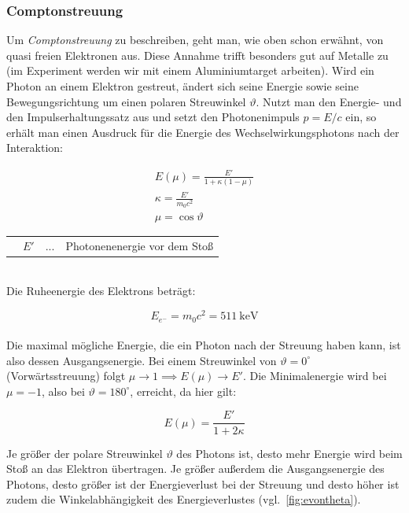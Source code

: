 \documentclass[slug=CS, room=Andreas-Schubert-Bau\,\ Labor\ 406,
supervisor=Juliane\ Volkmer, coursedate=29.\ 11.\ 2019]{../../Lab_Report_LaTeX/lab_report}
\newcommand{\cs}{\emph{Comptonstreuung }}
\begin{document}
\subsubsection{Comptonstreuung}
\label{sec:cs}

Um \cs zu beschreiben, geht man, wie oben schon erwähnt, von quasi freien Elektronen aus.
Diese Annahme trifft besonders gut auf Metalle zu (im Experiment werden wir mit einem Aluminiumtarget arbeiten).
Wird ein Photon an einem Elektron gestreut, ändert sich seine Energie sowie seine 
Bewegungsrichtung um einen polaren Streuwinkel \(\vartheta\). Nutzt man den Energie-
und den Impulserhaltungssatz aus und setzt den Photonenimpuls \(p = E/c\) ein, so erhält man
einen Ausdruck für die Energie des Wechselwirkungsphotons nach der Interaktion:

\begin{gather}
	E(\mu) = \frac{E'}{1 + \kappa(1 - \mu)} \label{eq:photoenergie}\\
	\kappa = \frac{E'}{m_0c^2}\\
	\mu = \cos\vartheta
\end{gather}

\begin{tabular}{llll}
	& \(E'\)    & ... & Photonenenergie vor dem Stoß
\end{tabular}\\

Die Ruheenergie des Elektrons beträgt:

\begin{equation}\label{key}
	E_{e^-} = m_0c^2 = \SI{511}{\kilo\electronvolt}
\end{equation}\\

Die maximal mögliche Energie, die ein Photon nach der Streuung haben kann, ist also dessen
Ausgangsenergie. Bei einem Streuwinkel von \(\vartheta = 0^\circ\) (Vorwärtsstreuung) folgt
\(\mu \rightarrow 1 \implies E(\mu) \rightarrow E'\).
Die Minimalenergie wird bei \(\mu = -1\), also bei \(\vartheta = 180^\circ\), erreicht, da
hier gilt:

\begin{equation}\label{eq:emax}
	E(\mu) = \frac{E'}{1 + 2\kappa}
\end{equation}

Je größer der polare Streuwinkel \(\vartheta\) des Photons ist, desto mehr Energie wird beim Stoß
an das Elektron übertragen. Je größer außerdem die Ausgangsenergie des Photons, desto größer ist
der Energieverlust bei der Streuung und desto höher ist zudem die Winkelabhängigkeit des
Energieverlustes (vgl.~\ref{fig:evontheta}).\\
\end{document}
